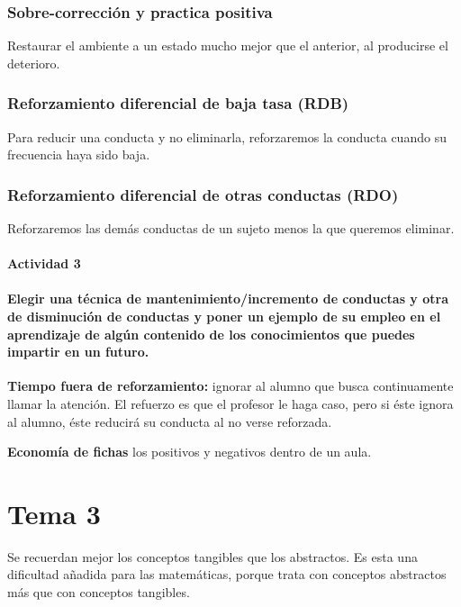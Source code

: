 \documentclass[palatino,nochap]{apuntesURJC}
\begin{document}
\subsubsection{Sobre-corrección y practica positiva}
Restaurar el ambiente a un estado mucho mejor que el anterior, al producirse el
deterioro.

\subsubsection{Reforzamiento diferencial de baja tasa (RDB)}
Para reducir una conducta y no eliminarla, reforzaremos la conducta cuando su frecuencia haya sido baja. 

\subsubsection{Reforzamiento diferencial de otras conductas (RDO)}
Reforzaremos las demás conductas de un sujeto menos la que queremos eliminar. 


\paragraph{Actividad 3}

\paragraph{Elegir una técnica de mantenimiento/incremento de conductas y otra de disminución de conductas y poner un ejemplo de su empleo en el aprendizaje de algún contenido de los conocimientos que puedes impartir en un futuro.}

\textbf{Tiempo fuera de reforzamiento:} ignorar al alumno que busca continuamente llamar la atención. El refuerzo es que el profesor le haga caso, pero si éste ignora al alumno, éste reducirá su conducta al no verse reforzada.

\textbf{Economía de fichas} los positivos y negativos dentro de un aula.


\section{Tema 3}



Se recuerdan mejor los conceptos tangibles que los abstractos. 
%
Es esta una dificultad añadida para las matemáticas, porque trata con conceptos abstractos más que con conceptos tangibles.
\end{document}
